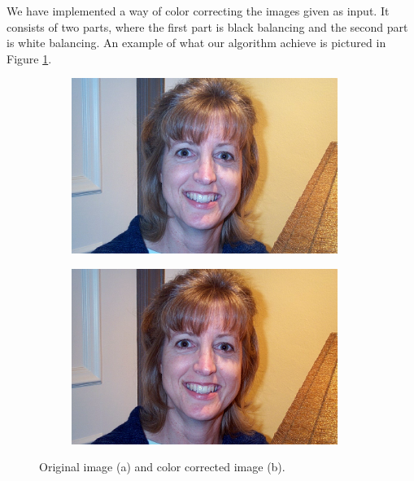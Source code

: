 We have implemented a way of color correcting the images given as input. It consists of two parts, where the first part is black balancing and the second part is white balancing. An example of what our algorithm achieve is pictured in Figure \ref{fig:cc}.  

\begin{figure}[H]
\centering

\begin{subfigure}{.33\textwidth}
  \centering
  \includegraphics[width=0.95\textwidth]{img/cc/orig.jpg}
  \caption{}
\end{subfigure}%
\begin{subfigure}{.33\textwidth}
  \centering
  \includegraphics[width=0.95\textwidth]{img/cc/cc.png}
  \caption{}
\end{subfigure}%

\caption{Original image (a) and color corrected image (b).}


\label{fig:cc}
\end{figure}


